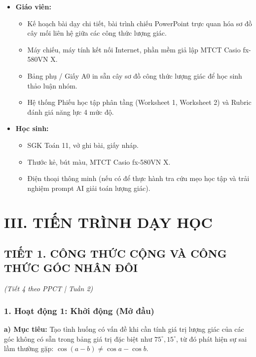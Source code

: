 \documentclass[12pt, a4paper]{article}
\begin{document}
\begin{itemize}[leftmargin=1.2cm]
    \item \textbf{Giáo viên:}
    \begin{itemize}[leftmargin=0.6cm]
        \item Kế hoạch bài dạy chi tiết, bài trình chiếu PowerPoint trực quan hóa sơ đồ cây mối liên hệ giữa các công thức lượng giác.
        \item Máy chiếu, máy tính kết nối Internet, phần mềm giả lập MTCT Casio fx-580VN X.
        \item Bảng phụ / Giấy A0 in sẵn cây sơ đồ công thức lượng giác để học sinh thảo luận nhóm.
        \item Hệ thống Phiếu học tập phân tầng (Worksheet 1, Worksheet 2) và Rubric đánh giá năng lực 4 mức độ.
    \end{itemize}
    \item \textbf{Học sinh:}
    \begin{itemize}[leftmargin=0.6cm]
        \item SGK Toán 11, vở ghi bài, giấy nháp.
        \item Thước kẻ, bút màu, MTCT Casio fx-580VN X.
        \item Điện thoại thông minh (nếu có để thực hành tra cứu mẹo học tập và trải nghiệm prompt AI giải toán lượng giác).
    \end{itemize}
\end{itemize}

\section*{III. TIẾN TRÌNH DẠY HỌC}

\subsection*{TIẾT 1. CÔNG THỨC CỘNG VÀ CÔNG THỨC GÓC NHÂN ĐÔI}
\textit{(Tiết 4 theo PPCT | Tuần 2)}

\subsubsection*{1. Hoạt động 1: Khởi động (Mở đầu)}
\textbf{a) Mục tiêu:} Tạo tình huống có vấn đề khi cần tính giá trị lượng giác của các góc không có sẵn trong bảng giá trị đặc biệt như $75^\circ, 15^\circ$, từ đó phát hiện sự sai lầm thường gặp: $\cos(a - b) \neq \cos a - \cos b$.
\end{document}
